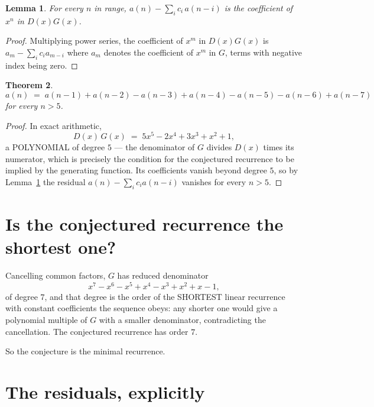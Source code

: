 \documentclass[11pt,a4paper]{article}
\theoremstyle{plain}
\newtheorem{theorem}{Theorem}
\newtheorem{lemma}[theorem]{Lemma}
\theoremstyle{definition}
\begin{document}
\begin{lemma}\label{lem:key}
For every $n$ in range, $a(n)-\sum_i c_i\,a(n-i)$ is the coefficient of $x^{n}$ in
$D(x)G(x)$.
\end{lemma}

\begin{proof}
Multiplying power series, the coefficient of $x^{m}$ in $D(x)G(x)$ is
$a_m-\sum_i c_i a_{m-i}$ where $a_m$ denotes the coefficient of $x^{m}$ in $G$, terms with
negative index being zero.
\end{proof}

\begin{theorem}
\[
a(n)\;=\;a(n-1) + a(n-2) - a(n-3) + a(n-4) - a(n-5) - a(n-6) + a(n-7)
\]
for every $n>5$.
\end{theorem}

\begin{proof}
In exact arithmetic,
\[
D(x)\,G(x)\;=\;5 x^{5} - 2 x^{4} + 3 x^{3} + x^{2} + 1,
\]
a POLYNOMIAL of degree $5$ --- the denominator of $G$ divides $D(x)$ times its numerator,
which is precisely the condition for the conjectured recurrence to be implied by the
generating function. Its coefficients vanish beyond degree $5$, so by
Lemma~\ref{lem:key} the residual $a(n)-\sum_ic_ia(n-i)$ vanishes for every
$n>5$.
\end{proof}

\section{Is the conjectured recurrence the shortest one?}

Cancelling common factors, $G$ has reduced denominator
\[
x^{7} - x^{6} - x^{5} + x^{4} - x^{3} + x^{2} + x - 1,
\]
of degree $7$, and that degree is the order of the SHORTEST linear recurrence with
constant coefficients the sequence obeys: any shorter one would give a polynomial multiple of
$G$ with a smaller denominator, contradicting the cancellation. The conjectured recurrence has
order $7$.

So the conjecture is the minimal recurrence.

\section{The residuals, explicitly}
\end{document}
